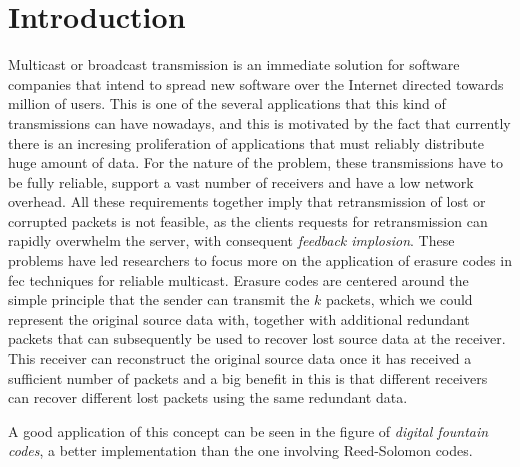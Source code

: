 \section{Introduction}
\label{sec:intro}
Multicast or broadcast transmission is an immediate solution for software companies that intend to spread new software over the Internet directed towards million of users. This is one of the several applications that this kind of transmissions can have nowadays, and this is motivated by the fact that currently there is an incresing proliferation of applications that must reliably distribute huge amount of data. For the nature of the problem, these transmissions have to be fully reliable, support a vast number of receivers and have a low network overhead. All these requirements together imply that retransmission of lost or corrupted packets is not feasible, as the clients requests for retransmission can rapidly overwhelm the server, with consequent \textit{feedback implosion}. \cite{Byers} These problems have led researchers to focus more on the application of erasure codes in \gls{fec} techniques for reliable multicast. Erasure codes are centered around the simple principle that the sender can transmit the $k$ packets, which we could represent the original source data with, together with additional redundant packets that can subsequently be used to recover lost source data at the receiver. This receiver can reconstruct the original source data once it has received a sufficient number of packets and a big benefit in this is that different receivers can recover different lost packets using the same redundant data.

A good application of this concept can be seen in the figure of \textit{digital fountain codes}, a better implementation than the one involving Reed-Solomon codes.\cite{Byers}
